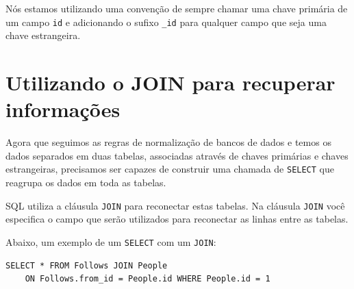 
Nós estamos utilizando uma convenção de sempre chamar uma chave primária de
um campo {\tt id} e adicionando o sufixo \verb"_id" para qualquer campo que
seja uma chave estrangeira.

\section{Utilizando o JOIN para recuperar informações}


Agora que seguimos as regras de normalização de bancos de dados e temos os
dados separados em duas tabelas, associadas através de chaves primárias e
chaves estrangeiras, precisamos ser capazes de construir uma chamada de
{\tt SELECT} que reagrupa os dados em toda as tabelas.


SQL utiliza a cláusula {\tt JOIN} para reconectar estas tabelas. Na cláusula
{\tt JOIN} você especifica o campo que serão utilizados para reconectar as
linhas entre as tabelas.


Abaixo, um exemplo de um {\tt SELECT} com um {\tt JOIN}:

\beforeverb
\begin{verbatim}
SELECT * FROM Follows JOIN People 
    ON Follows.from_id = People.id WHERE People.id = 1
\end{verbatim}
\afterverb
%

